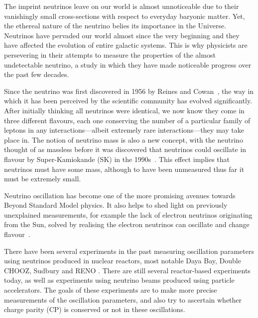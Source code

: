 \documentclass[aps,pra,12pt,notitlepage,tightenlines]{revtex4-1}
\begin{document}
The imprint neutrinos leave on our world is almost unnoticeable due to their vanishingly small cross-sections with respect to everyday baryonic matter. Yet, the ethereal nature of the neutrino belies its importance in the Universe. Neutrinos have pervaded our world almost since the very beginning and they have affected the evolution of entire galactic systems. This is why physicists are persevering in their attempts to measure the properties of the almost undetectable neutrino, a study in which they have made noticeable progress over the past few decades. 

Since the neutrino was first discovered in 1956 by Reines and Cowan~\cite{1956Natur.178..446R}, the way in which it has been perceived by the scientific community has evolved significantly. After initially thinking all neutrinos were identical, we now know they come in three different flavours, each one conserving the number of a particular family of leptons in any interactions---albeit extremely rare interactions---they may take place in. The notion of neutrino mass is also a new concept, with the neutrino thought of as massless before it was discovered that neutrinos could oscillate in flavour by Super-Kamiokande (SK) in the 1990s~\cite{Fukuda1998}. This effect implies that neutrinos must have some mass, although to have been unmeasured thus far it must be extremely small.

Neutrino oscillation has become one of the more promising avenues towards Beyond Standard Model physics. It also helps to shed light on previously unexplained measurements, for example the lack of electron neutrinos originating from the Sun, solved by realising the electron neutrinos can oscillate and change flavour~\cite{PhysRevLett.89.011301}. 

There have been several experiments in the past measuring oscillation parameters using neutrinos produced in nuclear reactors, most notable Daya Bay, Double CHOOZ, Sudbury and RENO \cite{PhysRevLett.108.171803, PhysRevLett.108.131801, PhysRevLett.89.011301, PhysRevLett.108.191802}. There are still several reactor-based experiments today, as well as experiments using neutrino beams produced using particle accelerators. The goals of these experiments are to make more precise measurements of the oscillation parameters, and also try to ascertain whether charge parity (CP) is conserved or not in these oscillations.
\end{document}
